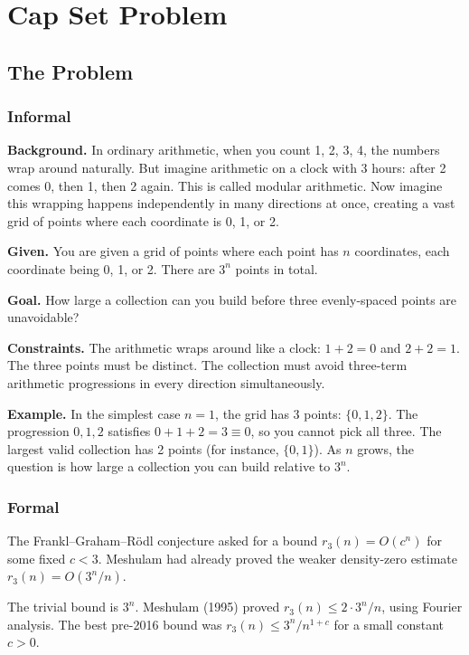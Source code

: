 \let\LocalMacro\relax

\chapter{Cap Set Problem}

\section{The Problem}

\subsection{Informal}

\textbf{Background.} In ordinary arithmetic, when you count 1, 2, 3, 4, the numbers wrap around naturally. But imagine arithmetic on a clock with 3 hours: after 2 comes 0, then 1, then 2 again. This is called modular arithmetic. Now imagine this wrapping happens independently in many directions at once, creating a vast grid of points where each coordinate is 0, 1, or 2.

\textbf{Given.} You are given a grid of points where each point has $n$ coordinates, each coordinate being 0, 1, or 2. There are $3^n$ points in total.

\textbf{Goal.} How large a collection can you build before three evenly-spaced points are unavoidable?

\textbf{Constraints.} The arithmetic wraps around like a clock: $1 + 2 = 0$ and $2 + 2 = 1$. The three points must be distinct. The collection must avoid three-term arithmetic progressions in every direction simultaneously.

\textbf{Example.} In the simplest case $n = 1$, the grid has 3 points: $\{0, 1, 2\}$. The progression $0, 1, 2$ satisfies $0 + 1 + 2 = 3 \equiv 0$, so you cannot pick all three. The largest valid collection has 2 points (for instance, $\{0, 1\}$). As $n$ grows, the question is how large a collection you can build relative to $3^n$.

\subsection{Formal}
The Frankl--Graham--Rödl conjecture asked for a bound $r_3(n)=O(c^n)$ for some fixed $c<3$. Meshulam had already proved the weaker density-zero estimate $r_3(n)=O(3^n/n)$.

The trivial bound is $3^n$. Meshulam (1995) proved $r_3(n) \le 2 \cdot 3^n / n$, using Fourier analysis. The best pre-2016 bound was $r_3(n) \le 3^n / n^{1+c}$ for a small constant $c > 0$.

